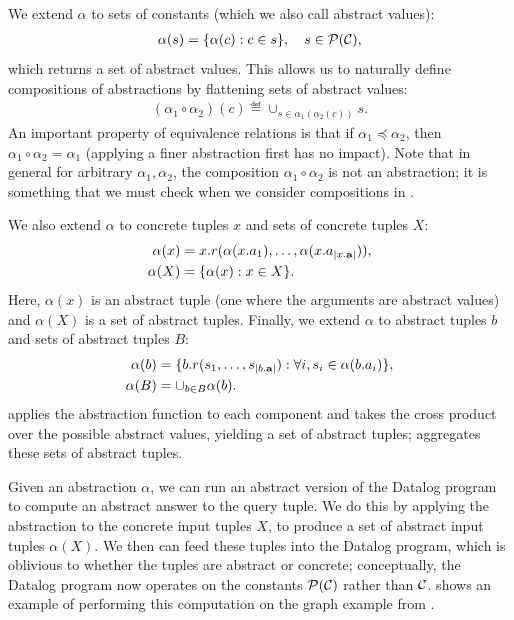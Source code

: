 We extend $\alpha$ to sets of constants (which we also call abstract values):
\begin{align}
\alpha(s) = \{ \alpha(c) : c \in s \}, \quad s \in \mathcal{P}(\mathcal{C}),
\end{align}
which returns a set of abstract values.
This allows us to naturally define compositions of abstractions
by flattening sets of abstract values:
\begin{align}
(\alpha_1 \circ \alpha_2)(c) \eqdef \cup_{s \in \alpha_1(\alpha_2(c))} s.
\end{align}
An important property of equivalence relations is
that if $\alpha_1 \preceq \alpha_2$, then $\alpha_1 \circ \alpha_2 = \alpha_1$
(applying a finer abstraction first has no impact).
Note that in general for arbitrary $\alpha_1,\alpha_2$,
the composition $\alpha_1 \circ \alpha_2$ is not an abstraction;
it is something that we must check when we consider compositions in
.

We also extend $\alpha$ to concrete tuples $x$ and sets of concrete tuples $X$:
\begin{align}
\alpha(x) &= x.r(\alpha(x.a_1), \dots, \alpha(x.a_{|x.\mathbf{a}|})), \\
\alpha(X) &= \{ \alpha(x) : x \in X \}.
\end{align}
Here, $\alpha(x)$ is an abstract tuple (one where the arguments are abstract values)
and $\alpha(X)$ is a set of abstract tuples.
Finally, we extend $\alpha$ to abstract tuples $b$ and sets of abstract tuples $B$:
\begin{align}
\alpha(b) &= \{ b.r(s_1, \dots, s_{|b.\mathbf{a}|}) : \forall i, s_i \in \alpha(b.a_i) \}, \label{eqn:alphab} \\
\alpha(B) &= \cup_{b \in B} \alpha(b). \label{eqn:alphaB}
\end{align}
 applies the abstraction function to each component and takes the cross product over the possible abstract values,
yielding a set of abstract tuples;
 aggregates these sets of abstract tuples.

Given an abstraction $\alpha$,
we can run an abstract version of the Datalog program to compute an abstract answer to the query tuple.
We do this by applying the abstraction to the concrete input tuples $X$,
to produce a set of abstract input tuples $\alpha(X)$.
We then can feed these tuples into the Datalog program,
which is oblivious to whether the tuples are abstract or concrete;
conceptually, the Datalog program now operates on the constants $\mathcal{P}(\mathcal{C})$ rather than $\mathcal{C}$.
 shows an example of performing this computation on the
graph example from .

